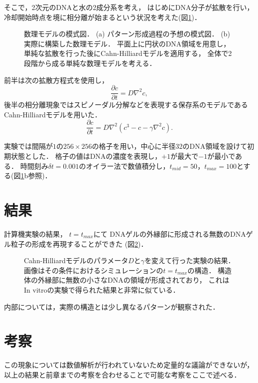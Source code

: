 そこで，2次元のDNAと水の2成分系を考え，
はじめにDNA分子が拡散を行い，
冷却開始時点を境に相分離が始まるという状況を考えた(図\ref{fig:model_cahn_hilliard})．
\begin{figure}
    \centering
    
    \caption{
        数理モデルの模式図．
        (a) パターン形成過程の予想の模式図．
        (b) 実際に構築した数理モデル．
            平面上に円状のDNA領域を用意し，
            単純な拡散を行った後にCahn-Hilliardモデルを適用する，
            全体で2段階から成る単純な数理モデルを考える．
    }
    \label{fig:model_cahn_hilliard}
\end{figure}
前半は次の拡散方程式を使用し，
\begin{equation}
    \frac{\partial c}{\partial t}
    =
    D \nabla^{2} c
    ,
\end{equation}
後半の相分離現象ではスピノーダル分解などを表現する保存系のモデルであるCahn-Hilliardモデルを用いた．
\begin{equation}
    \frac{\partial c}{\partial t}
    =
    D \nabla^{2} \left( c^3 - c - \gamma \nabla^{2} c \right)
    .
\end{equation}

実験では間隔が$1$の$256\times 256$の格子を用い，中心に半径32のDNA領域を設けて初期状態とした．
格子の値はDNAの濃度を表現し，$+1$が最大で$-1$が最小である．
時間刻み$\delta t=0.001$のオイラー法で数値積分し，$t_{mid}=50$，$t_{max}=100$とする(図\ref{fig:model_cahn_hilliard}b参照)．


\section{結果}
計算機実験の結果，
$t=t_{max}$にて
DNAゲルの外縁部に形成される無数のDNAゲル粒子の形成を再現することができた
(図\ref{fig:result_cahn_hilliard})．
\begin{figure}
    \centering
    
    \caption{
        Cahn-Hilliardモデルのパラメータ$D$と$\gamma$を変えて行った実験の結果．
        画像はその条件におけるシミュレーションの$t=t_{max}$の構造．
        構造体の外縁部に無数の小さなDNAの領域が形成されており，
        これはIn vitroの実験で得られた結果と非常に似ている．
    }
    \label{fig:result_cahn_hilliard}
\end{figure}
内部については，実際の構造とは少し異なるパターンが観察された．


\section{考察}
この現象については数値解析が行われていないため定量的な議論ができないが，
以上の結果と前章までの考察を合わせることで可能な考察をここで述べる．

